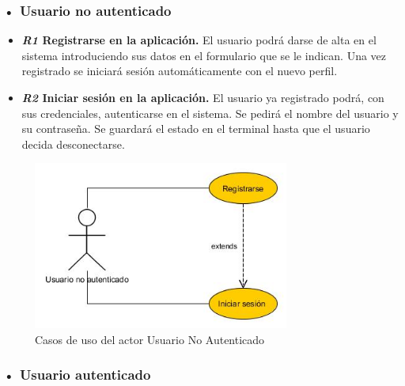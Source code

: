 \subsubsection{• Usuario no autenticado}
\begin{itemize}
\item\textbf{ \textit{R1}  Registrarse en la aplicación.}
 El usuario podrá darse de alta en el sistema
introduciendo sus datos en el formulario que se le indican. Una vez registrado se iniciará sesión
automáticamente con el nuevo perfil.

\item \textbf{\textit{R2} Iniciar sesión en la aplicación. }
El usuario ya registrado podrá, con
sus credenciales, autenticarse en el  sistema. Se pedirá el nombre del usuario y su contraseña. Se guardará el estado en el terminal hasta que el usuario decida desconectarse.
\end{itemize} 
\begin{figure}[H]
		\centering
		\includegraphics[width=0.75\textwidth] {usuario-no-autenticado.jpg}
		\caption{Casos de uso del actor Usuario No Autenticado }
	\end{figure}
	
	
	
\subsubsection{• Usuario  autenticado}

